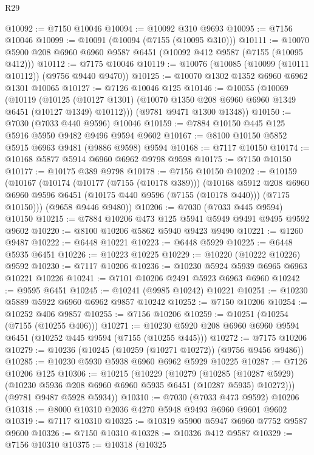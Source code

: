 \begin{lexlean}{R29}
\begin{coremodule}
@10092 := @7150 @10046
@10094 := @10092 @310 @9693
@10095 := @7156 @10046
@10099 := @10091 (@10094 (@7155 (@10095 @310)))
@10111 := @10070 @5900 @208 @6960 @6960 @9587 @6451 (@10092 @412 @9587 (@7155 (@10095 @412)))
@10112 := @7175 @10046
@10119 := @10076 (@10085 (@10099 (@10111 @10112)) (@9756 @9440 @9470))
@10125 := @10070 @1302 @1352 @6960 @6962 @1301 @10065
@10127 := @7126 @10046 @125
@10146 := @10055
    (@10069
      (@10119
        (@10125 (@10127 @1301) (@10070 @1350 @208 @6960 @6960 @1349 @6451 (@10127 @1349) @10112)))
      (@9781 @9471 @1300 @1348))
@10150 := @7030 (@7033 @440 @9596) @10046
@10159 := @7884 @10150 @445 @125 @5916 @5950 @9482 @9496 @9594 @9602
@10167 := @8100 @10150 @5852 @5915 @6963 @9481 (@9886 @9598) @9594
@10168 := @7117 @10150
@10174 := @10168 @5877 @5914 @6960 @6962 @9798 @9598
@10175 := @7150 @10150
@10177 := @10175 @389 @9798
@10178 := @7156 @10150
@10202 := @10159
    (@10167
      (@10174
        (@10177 (@7155 (@10178 @389)))
        (@10168
          @5912
          @208
          @6960
          @6960
          @9596
          @6451
          (@10175 @440 @9596 (@7155 (@10178 @440)))
          (@7175 @10150)))
      (@9658 @9446 @9480))
@10206 := @7030 (@7033 @445 @9594) @10150
@10215 := @7884 @10206 @473 @125 @5941 @5949 @9491 @9495 @9592 @9602
@10220 := @8100 @10206 @5862 @5940 @9423 @9490
@10221 := @1260 @9487
@10222 := @6448 @10221
@10223 := @6448 @5929
@10225 := @6448 @5935 @6451
@10226 := @10223 @10225
@10229 := @10220 (@10222 @10226) @9592
@10230 := @7117 @10206
@10236 := @10230 @5924 @5939 @6965 @6963 @10221 @10226
@10241 := @7101 @10206 @2491 @5923 @6963 @6960
@10242 := @9595 @6451
@10245 := @10241 (@9985 @10242) @10221
@10251 := @10230 @5889 @5922 @6960 @6962 @9857 @10242
@10252 := @7150 @10206
@10254 := @10252 @406 @9857
@10255 := @7156 @10206
@10259 := @10251 (@10254 (@7155 (@10255 @406)))
@10271 := @10230 @5920 @208 @6960 @6960 @9594 @6451 (@10252 @445 @9594 (@7155 (@10255 @445)))
@10272 := @7175 @10206
@10279 := @10236 (@10245 (@10259 (@10271 @10272)) (@9756 @9456 @9486))
@10285 := @10230 @5930 @5938 @6960 @6962 @5929 @10225
@10287 := @7126 @10206 @125
@10306 := @10215
    (@10229
      (@10279
        (@10285 (@10287 @5929) (@10230 @5936 @208 @6960 @6960 @5935 @6451 (@10287 @5935) @10272)))
      (@9781 @9487 @5928 @5934))
@10310 := @7030 (@7033 @473 @9592) @10206
@10318 := @8000 @10310 @2036 @4270 @5948 @9493 @6960 @9601 @9602
@10319 := @7117 @10310
@10325 := @10319 @5900 @5947 @6960 @7752 @9587 @9600
@10326 := @7150 @10310
@10328 := @10326 @412 @9587
@10329 := @7156 @10310
@10375 := @10318
    (@10325

\end{coremodule}
\end{lexlean}
